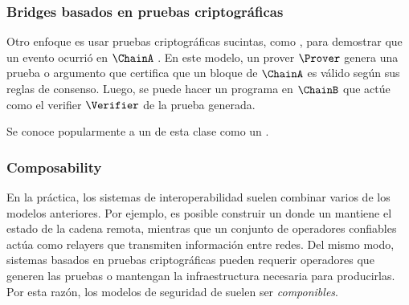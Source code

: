 \subsubsection{Bridges basados en pruebas criptográficas}

Otro enfoque es usar pruebas criptográficas sucintas, como \zkSNARK, para demostrar que un evento ocurrió en $\ChainA$ \cite{Xie2022}. En este modelo, un prover $\Prover$ genera una prueba o argumento que certifica que un bloque de $\ChainA$ es válido según sus reglas de consenso. Luego, se puede hacer un programa en $\ChainB$ que actúe como el verifier $\Verifier$ de la prueba generada.

Se conoce popularmente a un \Bridge de esta clase como un \zkBridge.

\subsubsection{Composability}

En la práctica, los sistemas de interoperabilidad suelen combinar varios de los modelos anteriores. Por ejemplo, es posible construir un \Bridge donde un \LightClient mantiene el estado de la cadena remota, mientras que un conjunto de operadores confiables actúa como relayers que transmiten información entre redes. Del mismo modo, sistemas basados en pruebas criptográficas pueden requerir operadores que generen las pruebas o mantengan la infraestructura necesaria para producirlas. Por esta razón, los modelos de seguridad de \Bridges suelen ser \emph{componibles}.
